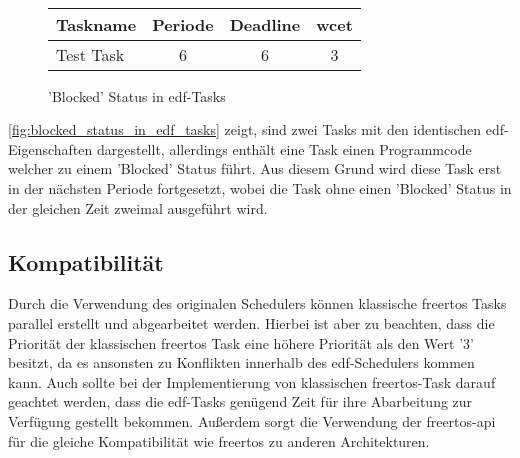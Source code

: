 \documentclass[../EDF Master Thesis.tex]{subfiles}
\begin{document}
\begin{figure}[H]
\\

        \vspace {0.5cm}
        \begin{tabular}{l|c|c|c}
            Taskname & Periode & Deadline & \ac{wcet} \\
            \hline
            Test Task & 6 & 6 & 3 \\
        \end{tabular}
        \caption{'Blocked' Status in \ac{edf}-Tasks}
        \label{fig:blocked_status_in_edf_tasks}
    \end{figure}

    \autoref{fig:blocked_status_in_edf_tasks} zeigt, sind zwei Tasks mit den identischen \ac{edf}-Eigenschaften dargestellt, allerdings enthält eine Task einen Programmcode welcher zu einem 'Blocked' Status führt.
    Aus diesem Grund wird diese Task erst in der nächsten Periode fortgesetzt, wobei die Task ohne einen 'Blocked' Status in der gleichen Zeit zweimal ausgeführt wird.


\subsection{Kompatibilität}

    Durch die Verwendung des originalen Schedulers können klassische \ac{freertos} Tasks parallel erstellt und abgearbeitet werden.
    Hierbei ist aber zu beachten, dass die Priorität der klassischen \ac{freertos} Task eine höhere Priorität als den Wert '3' besitzt, da es ansonsten zu Konflikten innerhalb des \ac{edf}-Schedulers kommen kann.
    Auch sollte bei der Implementierung von klassischen \ac{freertos}-Task darauf geachtet werden, dass die \ac{edf}-Tasks genügend Zeit für ihre Abarbeitung zur Verfügung gestellt bekommen.
    Außerdem sorgt die Verwendung der \ac{freertos}-\ac{api} für die gleiche Kompatibilität wie \ac{freertos} zu anderen Architekturen. 
\end{document}

